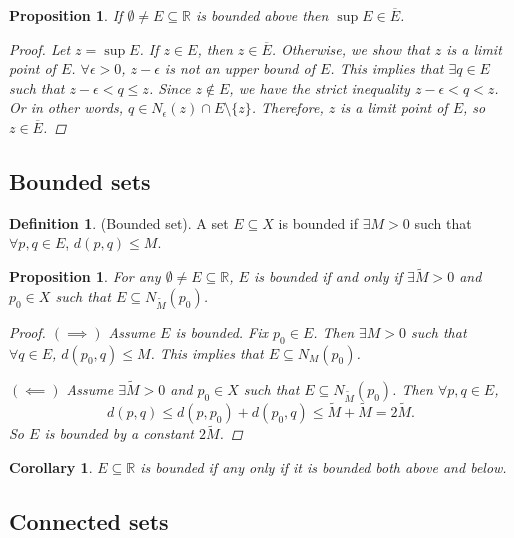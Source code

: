 \documentclass[10pt]{article}
\newcommand{\R}{\mathbb{R}}
\newtheorem{corollary}[theorem]{Corollary}
\newtheorem{proposition}[theorem]{Proposition}
\theoremstyle{definition}
\newtheorem{definition}[theorem]{Definition}
\theoremstyle{remark}
\begin{document}
\begin{proposition}
    If $\emptyset \neq E \subseteq \R$ is bounded above then $\sup E \in \overline{E}$.
    \begin{proof}
        Let $z = \sup E$. If $z \in E$, then $z \in \overline{E}$. Otherwise, we show that $z$ is a limit point of $E$.
        $\forall \epsilon > 0$, $z - \epsilon$ is not an upper bound of $E$. This implies that $\exists q \in E$ such that $z - \epsilon < q \leq z$.
        Since $z \not\in E$, we have the strict inequality $z - \epsilon < q < z$. Or in other words, $q \in N_\epsilon(z) \cap E \setminus \{z\}$.
        Therefore, $z$ is a limit point of $E$, so $z \in \overline{E}$.
    \end{proof}
\end{proposition}
\subsection{Bounded sets}
\begin{definition}
    (Bounded set).
    A set $E \subseteq X$ is bounded if $\exists M > 0$ such that $\forall p, q \in E$, $d(p, q) \leq M$.
\end{definition}
\begin{proposition}
    For any $\emptyset \neq E \subseteq \R$, $E$ is bounded if and only if $\exists \tilde{M} > 0$ and $p_0 \in X$ such that $E \subseteq N_{\tilde{M}}(p_0)$.
    \begin{proof}
        $(\implies)$ Assume $E$ is bounded. Fix $p_0 \in E$. Then $\exists M > 0$ such that $\forall q \in E$, $d(p_0, q) \leq M$. This implies that $E \subseteq N_M(p_0)$.

        $(\impliedby)$ Assume $\exists \tilde{M} > 0$ and $p_0 \in X$ such that $E \subseteq N_{\tilde{M}}(p_0)$. Then $\forall p, q \in E$,
        $$d(p, q) \leq d(p, p_0) + d(p_0, q) \leq \tilde{M} + \tilde{M} = 2\tilde{M}.$$
        So $E$ is bounded by a constant $2\tilde{M}$.
    \end{proof}
\end{proposition}

\begin{corollary}
    $E \subseteq \R$ is bounded if any only if it is bounded both above and below.
\end{corollary}

\subsection{Connected sets}
\end{document}
